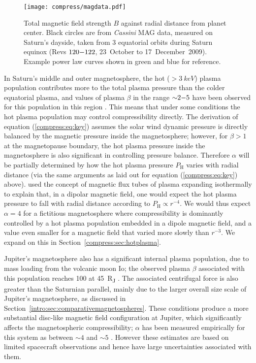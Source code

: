\begin{figure}
\centering
\noindent\texttt{[image: compress/magdata.pdf]}
\caption[Equatorial magnetic field data from \textit{Cassini} MAG.]{Total magnetic field strength $B$ against radial distance from planet center. Black circles are from \textit{Cassini} MAG data, measured on Saturn's dayside, taken from 3 equatorial orbits during Saturn equinox (Revs $120{\--}122$, 23~October to 17~December~2009). Example power law curves shown in green and blue for reference.}
\label{compress:fig:magdata}
\end{figure}

In Saturn's middle and outer magnetosphere, the  hot  ($>\SI{3}{keV}$) plasma population contributes more to the total plasma pressure than the colder equatorial plasma,  and values of plasma $\beta$ in the range ${\sim}2{\--}5$ have been observed  for this population in this region \citep{sergis2010}. This means that under some conditions the hot plasma population may control compressibility directly. The derivation of equation (\ref{compress:eq:key}) assumes the solar wind dynamic pressure is directly balanced by the magnetic pressure inside the magnetosphere; however, for $\beta > 1$ at the magnetopause boundary, the hot plasma pressure inside the magnetosphere is also significant in controlling pressure balance. Therefore $\alpha$ will be partially determined by how the hot plasma pressure $P_\mathrm{H}$ varies with radial distance (via the same arguments as laid out for equation (\ref{compress:eq:key}) above). \citet{gold1959} used the concept of magnetic flux tubes of plasma expanding isothermally to explain that, in a dipolar magnetic field, one would expect the hot plasma pressure to fall with radial distance according to $P_\mathrm{H} \propto r^{-4}$. We would thus expect $\alpha = 4$ for a fictitious magnetosphere where compressibility is dominantly controlled by a hot plasma population embedded in a dipole magnetic field, and a value even smaller for a magnetic field that varied more slowly than $r^{-3}$. We expand on this in Section~\ref{compress:sec:hotplasma}.

Jupiter's magnetosphere also has a significant internal plasma population, due to mass loading from the volcanic moon Io; the observed plasma $\beta$ associated with this population reaches 100 at \SI{45}{R_J} \citep{mauk2004}. The associated centrifugal force is also greater than the Saturnian parallel, mainly due to the larger overall size scale of Jupiter's magnetosphere, as discussed in Section~\ref{intro:sec:comparativemagnetospheres}. These conditions produce a more substantial disc-like magnetic field configuration at Jupiter, which significantly affects the magnetospheric compressibility; $\alpha$ has been measured empirically for this system as between ${\sim}4$ and ${\sim}5$ \citep{huddleston1998, joy2002, alexeev2005}. However these estimates are based on limited spacecraft observations and hence have large uncertainties associated with them.

